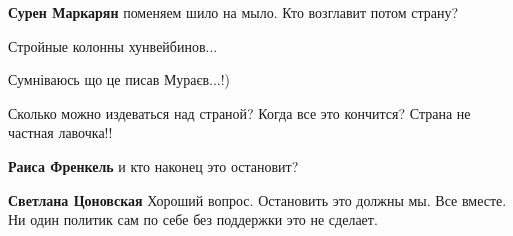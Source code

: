 \begin{itemize}
\begin{itemize}
\textbf{Сурен Маркарян} поменяем шило на мыло. Кто возглавит потом страну?

 
Стройные колонны хунвейбинов...

\end{itemize}

 
Сумніваюсь що це писав Мураєв...!)

\par
 
Сколько можно издеваться над страной? Когда все это кончится? Страна не частная лавочка!!

\begin{itemize}
 
\textbf{Раиса Френкель} и кто наконец это остановит?

 
\textbf{Светлана Цоновская} Хороший вопрос. Остановить это должны мы. Все вместе. Ни один политик сам по себе без поддержки это не сделает.

 

\end{itemize}
\end{itemize}
